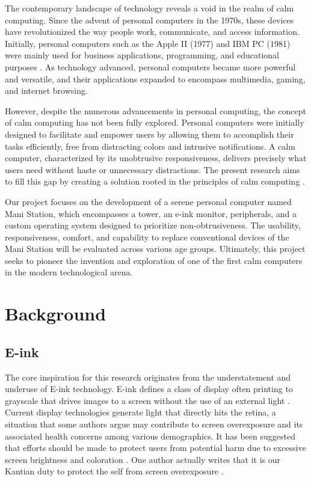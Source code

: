 \documentclass[letterpaper,twocolumn,10pt]{article}
\begin{document}
The contemporary landscape of technology reveals a void in the realm of calm computing. Since the advent of personal computers in the 1970s, these devices have revolutionized the way people work, communicate, and access information. Initially, personal computers such as the Apple II (1977) and IBM PC (1981) were mainly used for business applications, programming, and educational purposes \cite{computer-history}. As technology advanced, personal computers became more powerful and versatile, and their applications expanded to encompass multimedia, gaming, and internet browsing.

However, despite the numerous advancements in personal computing, the concept of calm computing has not been fully explored. Personal computers were initially designed to facilitate and empower users by allowing them to accomplish their tasks efficiently, free from distracting colors and intrusive notifications. A calm computer, characterized by its unobtrusive responsiveness, delivers precisely what users need without haste or unnecessary distractions. The present research aims to fill this gap by creating a solution rooted in the principles of calm computing \cite{dementiaux} \cite{calmcomputing}.

Our project focuses on the development of a serene personal computer named Mani Station, which encompasses a tower, an e-ink monitor, peripherals, and a custom operating system designed to prioritize non-obtrusiveness. The usability, responsiveness, comfort, and capability to replace conventional devices of the Mani Station will be evaluated across various age groups. Ultimately, this project seeks to pioneer the invention and exploration of one of the first calm computers in the modern technological arena.
\section{Background}
\subsection{E-ink}
The core inspiration for this research originates from the understatement and underuse of E-ink technology. E-ink defines a class of display often printing to grayscale that drives images to a screen without the use of an external light \cite{eink-def}.  Current display technologies generate light that directly hits the retina, a situation that some authors argue may contribute to screen overexposure and its associated health concerns among various demographics. It has been suggested that efforts should be made to protect users from potential harm due to excessive screen brightness and coloration \cite{screenaddiction}. One author actually writes that it is our Kantian duty to protect the self from screen overexposure \cite{kantscreens}.
\end{document}
